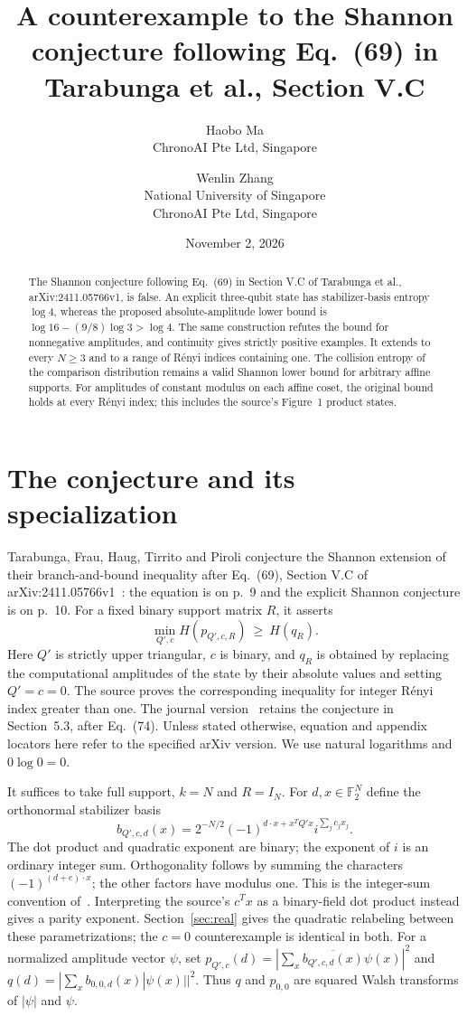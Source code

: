 \documentclass[11pt]{article}
\title{A counterexample to the Shannon conjecture following Eq.~(69)\newline
in Tarabunga et al., Section V.C}
\author{Haobo Ma\\{\small ChronoAI Pte Ltd, Singapore}
\and Wenlin Zhang\\{\small National University of Singapore}\\{\small ChronoAI Pte Ltd, Singapore}}
\date{November 2, 2026}
\newcommand{\F}{\mathbb F_2}
\newcommand{\HH}{H}
\begin{document}
\maketitle
\begin{abstract}
The Shannon conjecture following Eq.~(69) in Section V.C of
Tarabunga et al., arXiv:\allowbreak2411.05766v1, is false. An explicit three-qubit
state has stabilizer-basis entropy $\log 4$, whereas the proposed
absolute-amplitude lower bound is $\log16-(9/8)\log3>\log4$.
The same construction refutes the bound for nonnegative amplitudes,
and continuity gives strictly positive examples. It extends to every
$N\ge3$ and to a range of R\'enyi indices containing one.
The collision entropy of the comparison distribution remains a valid
Shannon lower bound for arbitrary affine supports. For amplitudes of constant
modulus on each affine coset, the original bound holds at every R\'enyi index;
this includes the source's Figure~1 product states.
\end{abstract}

\section{The conjecture and its specialization}
Tarabunga, Frau, Haug, Tirrito and Piroli conjecture the Shannon extension
of their branch-and-bound inequality after Eq.~(69),
Section V.C of arXiv:2411.05766v1~\cite{posing}: the equation is on p.~9
and the explicit Shannon conjecture is on p.~10.
For a fixed binary support matrix $R$, it asserts
\begin{equation}\label{eq:conjecture}
 \min_{Q',c}\HH(p_{Q',c,R})\ \ge\ \HH(q_R).
\end{equation}
Here $Q'$ is strictly upper triangular, $c$ is binary, and
$q_R$ is obtained by replacing the computational amplitudes of the state
by their absolute values and setting $Q'=c=0$.
The source proves the corresponding inequality for integer
R\'enyi index greater than one. The journal version~\cite{journal}
retains the conjecture in Section~5.3, after Eq.~(74).
Unless stated otherwise, equation and appendix locators here refer to
the specified arXiv version.
We use natural logarithms and $0\log0=0$.

It suffices to take full support, $k=N$ and $R=I_N$.
For $d,x\in\F^N$ define the orthonormal stabilizer basis
\begin{equation}\label{eq:basis}
 b_{Q',c,d}(x)=2^{-N/2}(-1)^{d\cdot x+x^TQ'x}i^{\sum_j c_jx_j}.
\end{equation}
The dot product and quadratic exponent are binary; the exponent of $i$
is an ordinary integer sum. Orthogonality follows by summing the
characters $(-1)^{(d+e)\cdot x}$; the other factors have modulus one.
This is the integer-sum convention of~\cite{lean}. Interpreting the
source's $c^Tx$ as a binary-field dot product instead gives a parity
exponent. Section~\ref{sec:real} gives the quadratic relabeling between
these parametrizations; the $c=0$ counterexample is identical in both.
For a normalized amplitude vector $\psi$, set
$p_{Q',c}(d)=|\sum_x\overline{b_{Q',c,d}(x)}\psi(x)|^2$
and $q(d)=|\sum_xb_{0,0,d}(x)|\psi(x)||^2$.
Thus $q$ and $p_{0,0}$ are squared Walsh transforms of $|\psi|$ and $\psi$.
\end{document}
